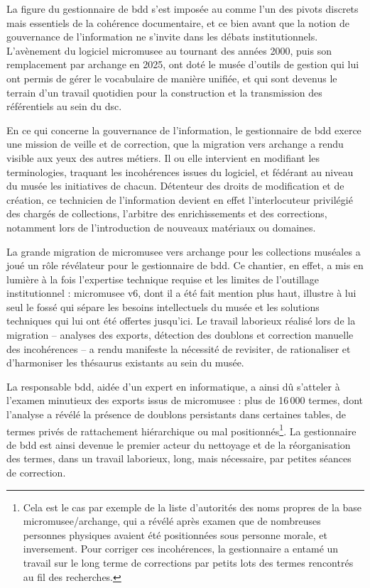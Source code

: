 La figure du gestionnaire de \ac{bdd} s’est imposée au \mae comme l’un des pivots discrets mais essentiels de la cohérence documentaire, et ce bien avant que la notion de gouvernance de l’information ne s’invite dans les débats institutionnels. L’avènement du logiciel \gls{micromusee} au tournant des années 2000, puis son remplacement par \gls{archange} en 2025, ont doté le musée d’outils de gestion qui lui ont permis de gérer le vocabulaire de manière unifiée, et qui sont devenus le terrain d’un travail quotidien pour la construction et la transmission des référentiels au sein du \ac{dsc}.

En ce qui concerne la gouvernance de l'information, le gestionnaire de \ac{bdd} exerce une mission de veille et de correction, que la migration vers \gls{archange} a rendu visible aux yeux des autres métiers. Il ou elle intervient en modifiant les terminologies, traquant les incohérences issues du logiciel, et fédérant au niveau du musée les initiatives de chacun. Détenteur des droits de modification et de création, ce technicien de l’information devient en effet l’interlocuteur privilégié des chargés de collections, l'arbitre des enrichissements et des corrections, notamment lors de l’introduction de nouveaux matériaux ou domaines.

La grande migration de \gls{micromusee} vers \gls{archange} pour les collections muséales a joué un rôle révélateur pour le gestionnaire de \ac{bdd}. Ce chantier, en effet, a mis en lumière à la fois l’expertise technique requise et les limites de l’outillage institutionnel : \gls{micromusee} v6, dont il a été fait mention plus haut, illustre à lui seul le fossé qui sépare les besoins intellectuels du musée et les solutions techniques qui lui ont été offertes jusqu'ici. Le travail laborieux réalisé lors de la migration -- analyses des exports, détection des doublons et correction manuelle des incohérences -- a rendu manifeste la nécessité de revisiter, de rationaliser et d'harmoniser les thésaurus existants au sein du musée.

La responsable \ac{bdd}, aidée d'un expert en informatique, a ainsi dû s'atteler à l’examen minutieux des exports issus de \gls{micromusee} : plus de 16\,000 termes, dont l’analyse a révélé la présence de doublons persistants dans certaines tables, de termes privés de rattachement hiérarchique ou mal positionnés\footnote{Cela est le cas par exemple de la liste d'autorités des noms propres de la base \gls{micromusee}/\gls{archange}, qui a révélé après examen que de nombreuses personnes physiques avaient été positionnées sous personne morale, et inversement. Pour corriger ces incohérences, la gestionnaire a entamé un travail sur le long terme de corrections par petits lots des termes rencontrés au fil des recherches.}. La gestionnaire de \ac{bdd} est ainsi devenue le premier acteur du nettoyage et de la réorganisation des termes, dans un travail laborieux, long, mais nécessaire, par petites séances de correction.

